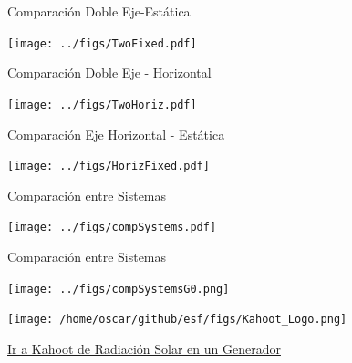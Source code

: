 \documentclass[xcolor={usenames,svgnames,dvipsnames}]{beamer}
\begin{document}
\begin{frame}[label={sec:org21c8432}]{Comparación Doble Eje-Estática}
\begin{center}
\texttt{[image: ../figs/TwoFixed.pdf]}
\end{center}
\end{frame}



\begin{frame}[label={sec:org0ee642c}]{Comparación Doble Eje - Horizontal}
\begin{center}
\texttt{[image: ../figs/TwoHoriz.pdf]}
\end{center}
\end{frame}



\begin{frame}[label={sec:org1ef26c3}]{Comparación Eje Horizontal - Estática}
\begin{center}
\texttt{[image: ../figs/HorizFixed.pdf]}
\end{center}
\end{frame}



\begin{frame}[label={sec:org2579046}]{Comparación entre Sistemas}
\begin{center}
\texttt{[image: ../figs/compSystems.pdf]}
\end{center}
\end{frame}

\begin{frame}[label={sec:org105a966}]{Comparación entre Sistemas}
\begin{center}
\texttt{[image: ../figs/compSystemsG0.png]}
\end{center}
\end{frame}


\begin{frame}[label={sec:orge044c17}]{}
\begin{center}
\texttt{[image: /home/oscar/github/esf/figs/Kahoot\_Logo.png]}
\end{center}

\href{https://play.kahoot.it/v2/?quizId=29a16906-539a-4e29-b68c-fe6c9141ef02}{Ir a Kahoot de Radiación Solar en un Generador}
\end{frame}
\end{document}
